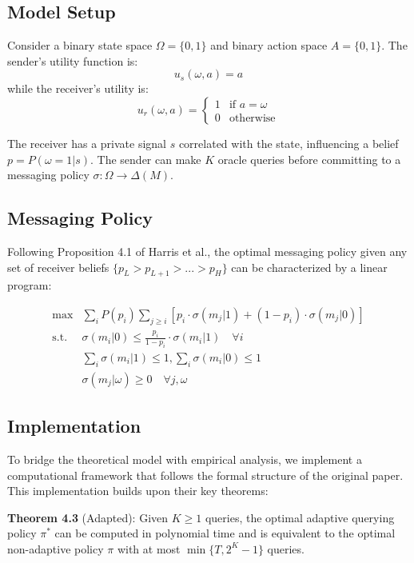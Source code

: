 \documentclass[12pt]{article}
\theoremstyle{plain}
\theoremstyle{definition}
\theoremstyle{remark}
\begin{document}
\subsection{Model Setup}
Consider a binary state space $\Omega = \{0,1\}$ and binary action space $A = \{0,1\}$. The sender's utility function is:
\begin{equation}
    u_s(\omega,a) = a
\end{equation}
while the receiver's utility is:
\begin{equation}
    u_r(\omega,a) = \begin{cases}
        1 & \text{if } a = \omega \\
        0 & \text{otherwise}
    \end{cases}
\end{equation}

The receiver has a private signal $s$ correlated with the state, influencing a belief $p = P(\omega=1|s)$. The sender can make $K$ oracle queries before committing to a messaging policy $\sigma: \Omega \rightarrow \Delta(M)$.

\subsection{Messaging Policy}
Following Proposition 4.1 of Harris et al., the optimal messaging policy given any set of receiver beliefs $\{p_L > p_{L+1} > ... > p_H\}$ can be characterized by a linear program:

\begin{align*}
    \max &\sum_i P(p_i) \sum_{j\geq i} [p_i\cdot\sigma(m_j|1) + (1-p_i)\cdot\sigma(m_j|0)] \\
    \text{s.t. } &\sigma(m_i|0) \leq \frac{p_i}{1-p_i}\cdot\sigma(m_i|1) \quad \forall i \\
    &\sum_i \sigma(m_i|1) \leq 1, \sum_i \sigma(m_i|0) \leq 1 \\
    &\sigma(m_j|\omega) \geq 0 \quad \forall j,\omega
\end{align*}

\subsection{Implementation}
To bridge the theoretical model with empirical analysis, we implement a computational framework that follows the formal structure of the original paper. This implementation builds upon their key theorems:

\textbf{Theorem 4.3} (Adapted): Given $K \geq 1$ queries, the optimal adaptive querying policy $\pi^*$ can be computed in polynomial time and is equivalent to the optimal non-adaptive policy $\pi$ with at most $\min\{T, 2^K - 1\}$ queries.
\end{document}
